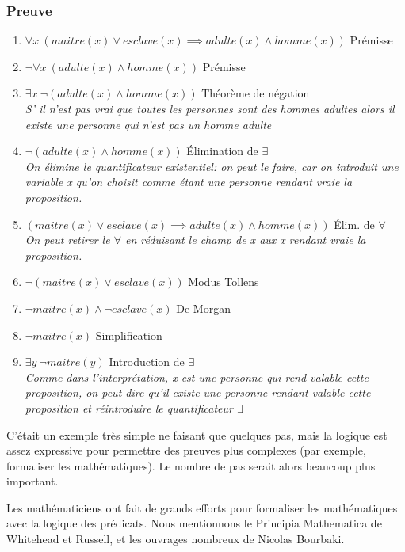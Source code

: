 \subsubsection{Preuve}
\begin{enumerate}
    \item $\forall{}x\ (maitre(x)\lor{}esclave(x)\implies{}adulte(x)\land{}homme(x))$ \hfill Prémisse
    \item $\lnot{}\forall{}x\ (adulte(x)\land{}homme(x))$ \hfill Prémisse
    \item $\exists{}x\ \lnot{}(adulte(x)\land{}homme(x))$ \hfill Théorème de négation\\
    \textit{S' il n'est pas vrai que toutes les personnes sont des hommes adultes alors il existe une personne qui n'est pas un homme adulte}
    \item $\lnot{}(adulte(x)\land{}homme(x))$ \hfill Élimination de $\exists$ \\
\textit{    On élimine le quantificateur existentiel:  on peut le faire, car on introduit une variable x qu'on choisit comme étant une personne rendant vraie la proposition.}
    \item $(maitre(x)\lor{}esclave(x)\implies{}adulte(x)\land{}homme(x))$ \hfill Élim. de $\forall$ \\
    \textit{On peut retirer le $\forall$  en réduisant le champ de x aux x rendant vraie la proposition.}
    \item $\lnot{}(maitre(x)\lor{}esclave(x))$ \hfill Modus Tollens
    \item $\lnot{}maitre(x)\land{}\lnot{}esclave(x)$ \hfill De Morgan
    \item $\lnot{}maitre(x)$ \hfill Simplification
    \item $\exists{}y\ \lnot{}maitre(y)$ \hfill Introduction de $\exists$ \\
    \textit{Comme dans l'interprétation, x est une personne qui rend valable cette proposition, on peut dire qu'il existe une personne rendant valable cette proposition et réintroduire le quantificateur $\exists$}
\end{enumerate}
C'était un exemple très simple ne faisant que quelques pas, mais la logique est assez expressive pour permettre des preuves plus complexes
(par exemple, formaliser les mathématiques).
Le nombre de pas serait alors beaucoup plus important. 

Les mathématiciens ont fait de grands efforts pour formaliser les mathématiques
avec la logique des prédicats.
Nous mentionnons le Principia Mathematica de Whitehead et Russell, et les ouvrages nombreux de Nicolas Bourbaki.

